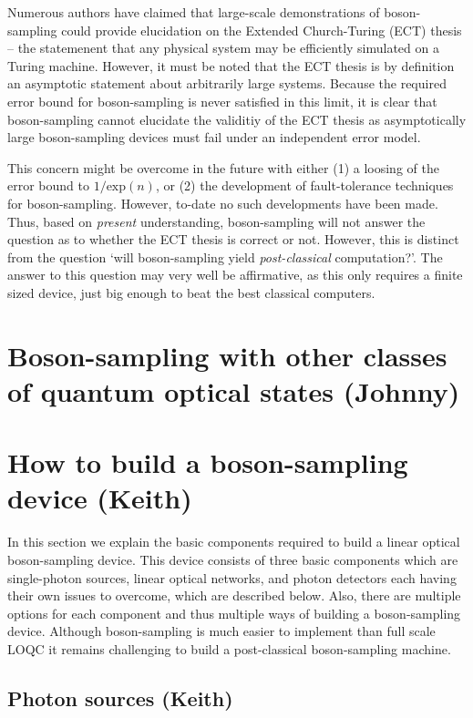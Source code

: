 \documentclass[aps,pra,twocolumn,amsmath,amssymb,nofootinbib,superscriptaddress]{revtex4}
\begin{document}
Numerous authors \cite{bib:Broome20122012, bib:ShenDuan13, bib:AA13response, bib:Shchesnovich13, bib:Molmer13} have claimed that large-scale demonstrations of boson-sampling could provide elucidation on the Extended Church-Turing (ECT) thesis -- the statemenent that any physical system may be efficiently simulated on a Turing machine. However, it must be noted that the ECT thesis is by definition an asymptotic statement about arbitrarily large systems. Because the required error bound for boson-sampling is never satisfied in this limit, it is clear that boson-sampling cannot elucidate the validitiy of the ECT thesis as asymptotically large boson-sampling devices must fail under an independent error model.

This concern might be overcome in the future with either (1) a loosing of the error bound to $1/\mathrm{exp}(n)$, or (2) the development of fault-tolerance techniques for boson-sampling. However, to-date no such developments have been made. Thus, based on \emph{present} understanding, boson-sampling will not answer the question as to whether the ECT thesis is correct or not. However, this is distinct from the question `will boson-sampling yield \emph{post-classical} computation?'. The answer to this question may very well be affirmative, as this only requires a finite sized device, just big enough to beat the best classical computers.

\section{Boson-sampling with other classes of quantum optical states (Johnny)}

\section{How to build a boson-sampling device (Keith)}

In this section we explain the basic components required to build a linear optical boson-sampling device. This device consists of three basic components which are single-photon sources, linear optical networks, and photon detectors each having their own issues to overcome, which are described below. Also, there are multiple options for each component and thus multiple ways of building a boson-sampling device. Although boson-sampling is much easier to implement than full scale LOQC it remains  challenging to build a post-classical boson-sampling machine. 

\subsection{Photon sources (Keith)}
\end{document}
